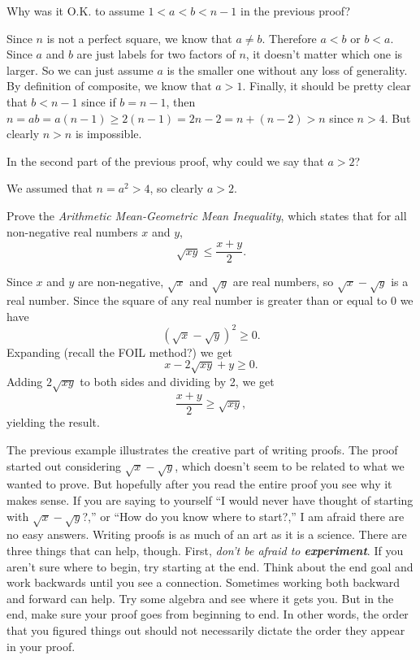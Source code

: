 \begin{ques}
Why was it O.K. to assume $1<a<b<n-1$ in the previous proof?\\
\answerlinethree
\begin{answer}
Since $n$ is not a perfect square, we know that $a\neq b$.  
Therefore  $a<b$ or $b<a$.  Since $a$ and $b$ are just labels for
two factors of $n$, it doesn't matter which one is larger.  So we can
just assume $a$ is the smaller one without any loss of generality.
By definition of composite, we know that $a>1$.
Finally, it should be pretty clear that $b<n-1$ since if $b=n-1$, then
$n=ab=a(n-1)\geq 2(n-1)=2n-2=n+(n-2)>n$ since $n>4$. But clearly $n>n$ is impossible.
\end{answer}
\end{ques}

\begin{ques}
In the second part of the previous proof, why could we say that $a>2$?
\answerline
\begin{answer}
We assumed that $n=a^2>4$, so clearly $a>2$.
\end{answer}
\end{ques}


\begin{exa}\label{exa:AMGM_inequalityn=2}
Prove the
{\em Arithmetic Mean-Geometric Mean Inequality}, which states that for
all non-negative real numbers $x$ and $y$,  
$$\sqrt{xy} \leq \dfrac{x+y}{2}.   $$
\begin{pf}
Since $x$ and $y$ are non-negative, $\sqrt{x}$ and $\sqrt{y}$ are real numbers, so
 $\sqrt{x} - \sqrt{y}$ is a real number.
 Since the square of any real number is greater than
or equal to $0$ we have
$$ (\sqrt{x} - \sqrt{y})^2\geq 0.$$
Expanding (recall the FOIL method?) we get
$$ x - 2\sqrt{xy} + y \geq 0.$$
Adding $ 2\sqrt{xy}$ to both sides and dividing by 2, we get
$$\dfrac{x + y}{2} \geq \sqrt{xy}, $$
yielding the result.
\end{pf}
\end{exa}

The previous example illustrates the creative part of writing proofs.  
The proof started out considering $\sqrt{x} - \sqrt{y}$, which doesn't seem to be related
to what we wanted to prove.  But hopefully after you read the entire proof you see why
it makes sense.  If you are saying to yourself ``I would never have thought of  starting with $\sqrt{x}-\sqrt{y}$?,''
or ``How do you know where to start?,'' I am afraid there are no easy answers.   Writing proofs is as much
of an art as it is a science.  There are three things that can help, though.  
First, {\em don't be afraid to {\bf\em experiment}}.
If you aren't sure where to begin, try starting at the end.  Think about the end goal and work backwards until
you see a connection.  Sometimes working both backward and forward can help.  
Try some algebra and see where it gets you.  But in the end, make sure your proof goes
from beginning to end.  In other words, the order that you figured things out should not necessarily
dictate the order they appear in your proof.

